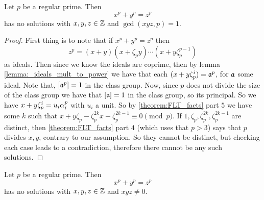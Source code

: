 \begin{theorem}\label{theorem:FLT_case_one}
	Let $p$ be a regular prime. Then \[x^p+y^p=z^p\] has no solutions with $x,y,z \in \mathbb{Z}$ and $\gcd(xyz,p)=1$. 
\end{theorem}
\begin{proof}
	First thing is to note that if $x^p+y^p=z^p$ then \[z^p=(x+y)(x+\zeta_py)\cdots(x+y\zeta_p^{p-1})\] as ideals. Then since we know the ideals are coprime, then by lemma \ref{lemma:_ideals_mult_to_power} we have that each $(x+y\zeta_p^i)=\mathfrak{a}^p$, for $\mathfrak{a}$ some ideal. Note that, $[\mathfrak{a}^p]=1$ in the class group. Now, since $p$ does not divide the size of the class group we have that $[\mathfrak{a}]=1$ in the class group, so its principal. So we have $x+y\zeta_p^i=u_i\alpha_i^p$ with $u_i$ a unit. So by \ref{theorem:FLT_facts} part $5$ we have some $k$ such that $x+y\zeta_p-\zeta_p^{2k}x-\zeta_p^{2k-1} \equiv 0 \pmod p$. If $1,\zeta_p,\zeta_p^{2k},\zeta_p^{2k-1}$ are distinct, then \ref{theorem:FLT_facts} part $4$ (which uses that $p>3$) says that $p$  divides $x,y$, contrary to our assumption. So they cannot be distinct, but checking each case leads to a contradiction, therefore there cannot be any such solutions.
\end{proof}


\begin{theorem}\label{FLT_regular_case}
	Let $p$ be a regular prime.  Then \[x^p+y^p=z^p\] has no solutions with $x,y,z \in \mathbb{Z}$ and $xyz \ne 0$. 
\end{theorem}
